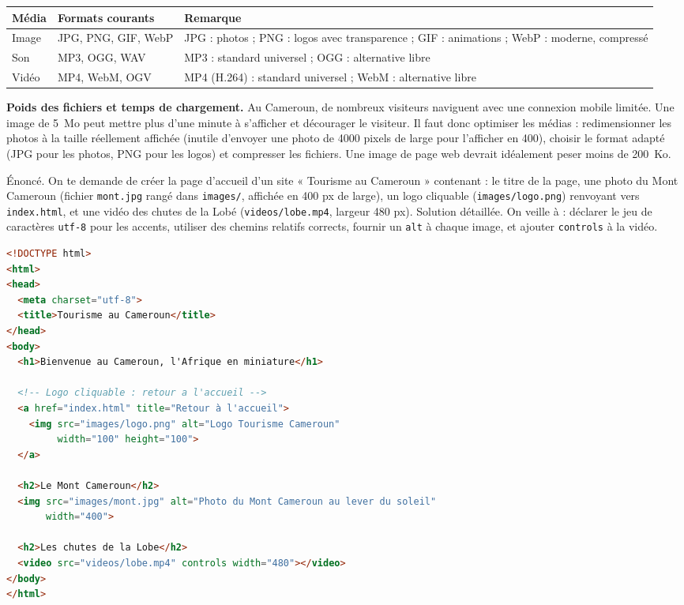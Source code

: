 \documentclass[11pt]{article}
\newcommand{\cle}[1]{{\popxbold\color{popdark}#1}}
\begin{document}
\begin{aretenir}
\begin{center}
\begin{tabularx}{\linewidth}{|l|X|X|}
\hline
\rowcolor{popblueL} \textbf{Média} & \textbf{Formats courants} & \textbf{Remarque} \\
\hline
Image & JPG, PNG, GIF, WebP & JPG : photos ; PNG : logos avec transparence ; GIF : animations ; WebP : moderne, compressé \\
\hline
Son & MP3, OGG, WAV & MP3 : standard universel ; OGG : alternative libre \\
\hline
Vidéo & MP4, WebM, OGV & MP4 (H.264) : standard universel ; WebM : alternative libre \\
\hline
\end{tabularx}
\end{center}
\end{aretenir}

\textbf{Poids des fichiers et temps de chargement.} Au Cameroun, de nombreux visiteurs naviguent avec une connexion mobile limitée. Une image de \SI{5}{Mo} peut mettre plus d'une minute à s'afficher et décourager le visiteur. Il faut donc \cle{optimiser} les médias : redimensionner les photos à la taille réellement affichée (inutile d'envoyer une photo de 4000 pixels de large pour l'afficher en 400), choisir le format adapté (JPG pour les photos, PNG pour les logos) et compresser les fichiers. Une image de page web devrait idéalement peser moins de \SI{200}{Ko}.

\begin{exoresolu}
Énoncé. On te demande de créer la page d'accueil d'un site « Tourisme au Cameroun » contenant : le titre de la page, une photo du Mont Cameroun (fichier \texttt{mont.jpg} rangé dans \texttt{images/}, affichée en 400 px de large), un logo cliquable (\texttt{images/logo.png}) renvoyant vers \texttt{index.html}, et une vidéo des chutes de la Lobé (\texttt{videos/lobe.mp4}, largeur 480 px).
\tcblower
Solution détaillée. On veille à : déclarer le jeu de caractères \texttt{utf-8} pour les accents, utiliser des chemins relatifs corrects, fournir un \texttt{alt} à chaque image, et ajouter \texttt{controls} à la vidéo.
\begin{lstlisting}[language=HTML]
<!DOCTYPE html>
<html>
<head>
  <meta charset="utf-8">
  <title>Tourisme au Cameroun</title>
</head>
<body>
  <h1>Bienvenue au Cameroun, l'Afrique en miniature</h1>

  <!-- Logo cliquable : retour a l'accueil -->
  <a href="index.html" title="Retour à l'accueil">
    <img src="images/logo.png" alt="Logo Tourisme Cameroun"
         width="100" height="100">
  </a>

  <h2>Le Mont Cameroun</h2>
  <img src="images/mont.jpg" alt="Photo du Mont Cameroun au lever du soleil"
       width="400">

  <h2>Les chutes de la Lobe</h2>
  <video src="videos/lobe.mp4" controls width="480"></video>
</body>
</html>
\end{lstlisting}
\end{exoresolu}
\end{document}
